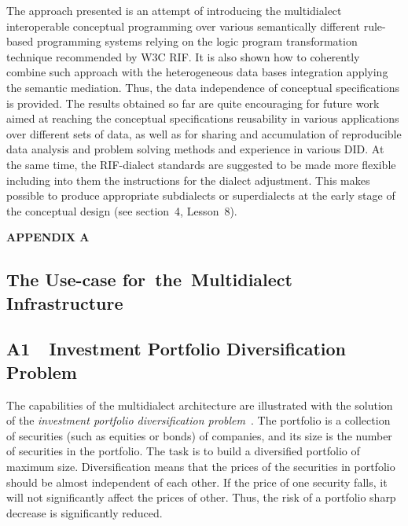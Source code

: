 \begin{multicols}{2}
  The approach presented is an attempt of introducing the multidialect interoperable
conceptual programming over various semantically different rule-based programming
systems relying on the logic program transformation technique recommended by
W3C RIF. It is also shown how to coherently combine such approach with the
heterogeneous data bases integration applying the semantic mediation. Thus, the data
independence of conceptual specifications is provided. The results obtained so far are
quite encouraging for future work aimed at reaching the conceptual specifications
reusability in various applications over different sets of data, as well as for sharing
and accumulation of reproducible data analysis and problem solving methods and
experience in various DID.
%
At the same time, the RIF-dialect standards are suggested to be made more 
flexible including into them the instructions for the dialect adjustment. 
This makes possible to produce appropriate subdialects or superdialects at 
the early stage of the conceptual design (see section~4, Lesson~8).

\vspace*{18pt}

{{\hfill \textbf{APPENDIX A}}}

\vspace*{-6pt}
{\small 
\subsection*{The Use-case for~the~Multidialect
Infrastructure}
\subsection*{A1\ \ Investment Portfolio Diversification\\
\hspace*{20pt}Problem}

  \noindent
  The capabilities of the multidialect architecture are illustrated with the solution of
the \textit{investment portfolio diversification problem}~\cite{31-kal}. The portfolio
is a collection of securities (such as equities or bonds) of companies, and its size is the
number of securities in the portfolio. The task is to build a diversified portfolio of
maximum size. Diversification means that the prices of the securities in portfolio
should be almost independent of each other. If the price of one security falls, it will
not significantly affect the prices of other. Thus, the risk of a portfolio sharp decrease
is significantly reduced.

}
\end{multicols}
